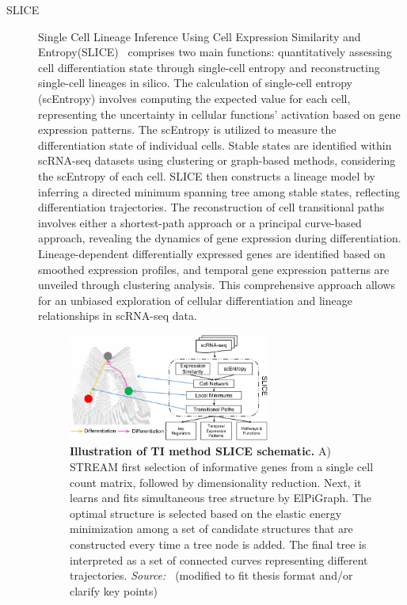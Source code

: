 \begin{description}
  \item[SLICE]
  Single Cell Lineage Inference Using Cell Expression Similarity and Entropy(SLICE)~\citep{guo2017slice} comprises two main functions: quantitatively assessing cell differentiation state through single-cell entropy and reconstructing single-cell lineages in silico. The calculation of single-cell entropy (scEntropy) involves computing the expected value for each cell, representing the uncertainty in cellular functions' activation based on gene expression patterns. The scEntropy is utilized to measure the differentiation state of individual cells. Stable states are identified within scRNA-seq datasets using clustering or graph-based methods, considering the scEntropy of each cell. SLICE then constructs a lineage model by inferring a directed minimum spanning tree among stable states, reflecting differentiation trajectories. The reconstruction of cell transitional paths involves either a shortest-path approach or a principal curve-based approach, revealing the dynamics of gene expression during differentiation. Lineage-dependent differentially expressed genes are identified based on smoothed expression profiles, and temporal gene expression patterns are unveiled through clustering analysis. This comprehensive approach allows for an unbiased exploration of cellular differentiation and lineage relationships in scRNA-seq data.
  \begin{figure}[ht!]
  	\centering
  	\includegraphics[width=0.65\textwidth]{TI_Alg_SLICE/fig}
  	\vspace{0.1cm}
  	\caption[Illustration of TI method SLICE schematic.]{\textbf{Illustration of TI method SLICE schematic.}
  	A) STREAM first selection of informative genes from a single cell count matrix, followed by dimensionality reduction. Next, it learns and fits simultaneous tree structure by ElPiGraph. The optimal structure is selected based on the elastic energy minimization among a set of candidate structures that are constructed every time a tree node is added. The final tree is interpreted as a set of connected curves representing different trajectories. \emph{Source:~\cite{guo2017slice}} (modified to fit thesis format and/or clarify key points)
  	}
  	\label{fig:TI_Alg_SLICE}
  \end{figure}


\end{description}
